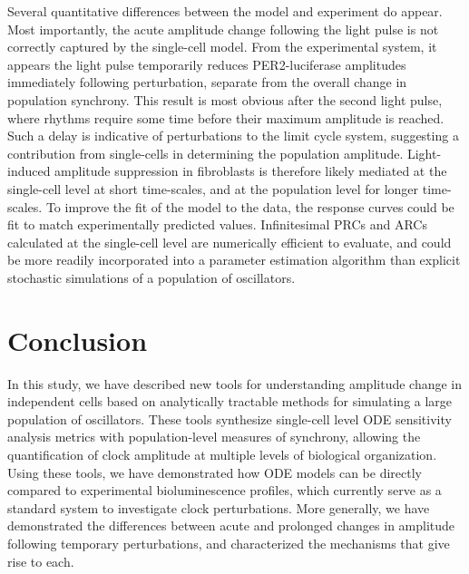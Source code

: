 \documentclass[11pt, letterpaper]{article}
\begin{document}
Several quantitative differences between the model and experiment do appear.
Most importantly, the acute amplitude change following the light pulse is not correctly captured by the single-cell model.
From the experimental system, it appears the light pulse temporarily reduces PER2-luciferase amplitudes immediately following perturbation, separate from the overall change in population synchrony.
This result is most obvious after the second light pulse, where rhythms require some time before their maximum amplitude is reached.
Such a delay is indicative of perturbations to the limit cycle system, suggesting a contribution from single-cells in determining the population amplitude.
Light-induced amplitude suppression in fibroblasts is therefore likely mediated at the single-cell level at short time-scales, and at the population level for longer time-scales.
To improve the fit of the model to the data, the response curves could be fit to match experimentally predicted values.
Infinitesimal PRCs and ARCs calculated at the single-cell level are numerically efficient to evaluate, and could be more readily incorporated into a parameter estimation algorithm than explicit stochastic simulations of a population of oscillators.

\section*{Conclusion}

In this study, we have described new tools for understanding amplitude change in independent cells based on analytically tractable methods for simulating a large population of oscillators.
These tools synthesize single-cell level ODE sensitivity analysis metrics with population-level measures of synchrony, allowing the quantification of clock amplitude at multiple levels of biological organization.
Using these tools, we have demonstrated how ODE models can be directly compared to experimental bioluminescence profiles, which currently serve as a standard system to investigate clock perturbations.
More generally, we have demonstrated the differences between acute and prolonged changes in amplitude following temporary perturbations, and characterized the mechanisms that give rise to each.
\end{document}
